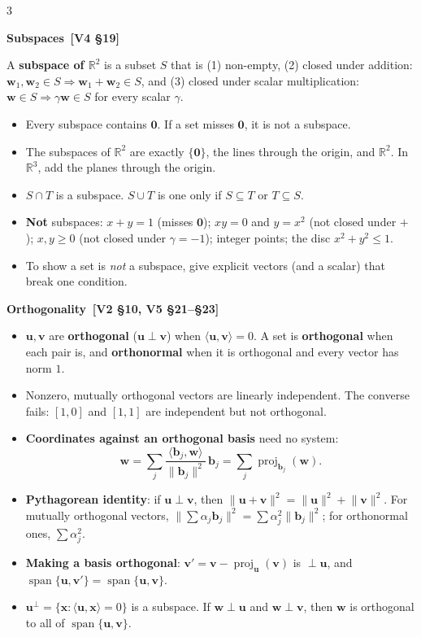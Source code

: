\documentclass[8pt]{extarticle}
\newcommand{\sub}[1]{\par\vspace{3pt}\noindent
  {\color{RoyalBlue}\bfseries\sffamily #1}\par\vspace{0.5pt}}
\newcommand{\src}[1]{{\color{gray}\,[#1]}}
\newcommand{\R}{\mathbb{R}}
\newcommand{\vc}[1]{\mathbf{#1}}
\newcommand{\norm}[1]{\lVert #1\rVert}
\newcommand{\ip}[2]{\langle #1,#2\rangle}
\newcommand{\proj}[2]{\operatorname{proj}_{#1}(#2)}
\DeclareMathOperator{\spanop}{span}
\begin{document}
\begin{multicols*}{3}
\sub{Subspaces \src{V4 \S19}}
A \textbf{subspace of $\R^{2}$} is a subset $S$ that is
(1) non-empty, (2) closed under addition: $\vc{w}_1,\vc{w}_2\in S\Rightarrow
\vc{w}_1+\vc{w}_2\in S$, and (3) closed under scalar multiplication:
$\vc{w}\in S\Rightarrow\gamma\vc{w}\in S$ for every scalar $\gamma$.
\begin{itemize}
  \item Every subspace contains $\vc{0}$. If a set misses $\vc{0}$, it is not
        a subspace.
  \item The subspaces of $\R^{2}$ are exactly $\{\vc{0}\}$, the lines through
        the origin, and $\R^{2}$. In $\R^{3}$, add the planes through the
        origin.
  \item $S\cap T$ is a subspace. $S\cup T$ is one only if $S\subseteq T$ or
        $T\subseteq S$.
  \item \textbf{Not} subspaces: $x+y=1$ (misses $\vc{0}$); $xy=0$ and
        $y=x^{2}$ (not closed under $+$); $x,y\ge0$ (not closed under
        $\gamma=-1$); integer points; the disc $x^{2}+y^{2}\le1$.
  \item To show a set is \emph{not} a subspace, give explicit vectors (and a
        scalar) that break one condition.
\end{itemize}

\sub{Orthogonality \src{V2 \S10, V5 \S21--\S23}}
\begin{itemize}
  \item $\vc{u},\vc{v}$ are \textbf{orthogonal} ($\vc{u}\perp\vc{v}$) when
        $\ip{\vc{u}}{\vc{v}}=0$. A set is \textbf{orthogonal} when each pair
        is, and \textbf{orthonormal} when it is orthogonal and every vector has
        norm $1$.
  \item Nonzero, mutually orthogonal vectors are linearly independent. The
        converse fails: $[1,0]$ and $[1,1]$ are independent but not orthogonal.
  \item \textbf{Coordinates against an orthogonal basis} need no system:
        \[
          \vc{w}=\sum_j\frac{\ip{\vc{b}_j}{\vc{w}}}{\norm{\vc{b}_j}^{2}}\,\vc{b}_j
          =\sum_j\proj{\vc{b}_j}{\vc{w}} .
        \]
  \item \textbf{Pythagorean identity}: if $\vc{u}\perp\vc{v}$, then
        $\norm{\vc{u}+\vc{v}}^{2}=\norm{\vc{u}}^{2}+\norm{\vc{v}}^{2}$. For
        mutually orthogonal vectors,
        $\norm{\sum\alpha_j\vc{b}_j}^{2}=\sum\alpha_j^{2}\norm{\vc{b}_j}^{2}$;
        for orthonormal ones, $\sum\alpha_j^{2}$.
  \item \textbf{Making a basis orthogonal}:
        $\vc{v}'=\vc{v}-\proj{\vc{u}}{\vc{v}}$ is $\perp\vc{u}$, and
        $\spanop\{\vc{u},\vc{v}'\}=\spanop\{\vc{u},\vc{v}\}$.
  \item $\vc{u}^{\perp}=\{\vc{x}:\ip{\vc{u}}{\vc{x}}=0\}$ is a subspace. If
        $\vc{w}\perp\vc{u}$ and $\vc{w}\perp\vc{v}$, then $\vc{w}$ is
        orthogonal to all of $\spanop\{\vc{u},\vc{v}\}$.
\end{itemize}


\end{multicols*}
\end{document}
